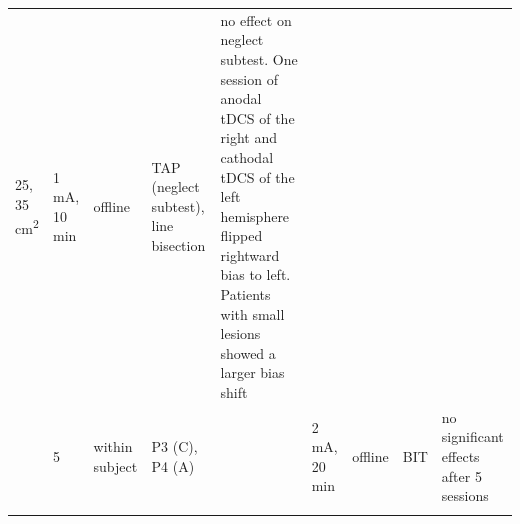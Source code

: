\documentclass[11pt,english,]{memoir}
\begin{document}
\begin{longtable}[]{@{}lllllllll@{}}
\begin{minipage}[t]{0.04\columnwidth}
25,
35
cm\textsuperscript{2}\strut
\end{minipage} & \begin{minipage}[t]{0.04\columnwidth}\raggedright
1 mA,
10 min\strut
\end{minipage} & \begin{minipage}[t]{0.04\columnwidth}\raggedright
offline\strut
\end{minipage} & \begin{minipage}[t]{0.10\columnwidth}\raggedright
TAP (neglect
subtest), line
bisection\strut
\end{minipage} & \begin{minipage}[t]{0.28\columnwidth}\raggedright
no effect on neglect subtest. One session of anodal tDCS of
the right and cathodal tDCS of the left hemisphere flipped
rightward bias to left. Patients with small lesions showed a
larger bias shift\strut
\end{minipage}\tabularnewline
\begin{minipage}[t]{0.09\columnwidth}\raggedright
\textcite{Smit2015}\strut
\end{minipage} & \begin{minipage}[t]{0.02\columnwidth}\raggedright
5\strut
\end{minipage} & \begin{minipage}[t]{0.04\columnwidth}\raggedright
within
subject\strut
\end{minipage} & \begin{minipage}[t]{0.10\columnwidth}\raggedright
P3 (C), P4 (A)\strut
\end{minipage} & \begin{minipage}[t]{0.04\columnwidth}\raggedright
\strut
\end{minipage} & \begin{minipage}[t]{0.04\columnwidth}\raggedright
2 mA,
20 min\strut
\end{minipage} & \begin{minipage}[t]{0.04\columnwidth}\raggedright
offline\strut
\end{minipage} & \begin{minipage}[t]{0.10\columnwidth}\raggedright
BIT\strut
\end{minipage} & \begin{minipage}[t]{0.28\columnwidth}\raggedright
no significant effects after 5 sessions\strut
\end{minipage}\tabularnewline
\begin{minipage}[t]{0.09\columnwidth}\raggedright
\textcite{Ladavas2015}\strut

\end{minipage}
\end{longtable}
\end{document}
